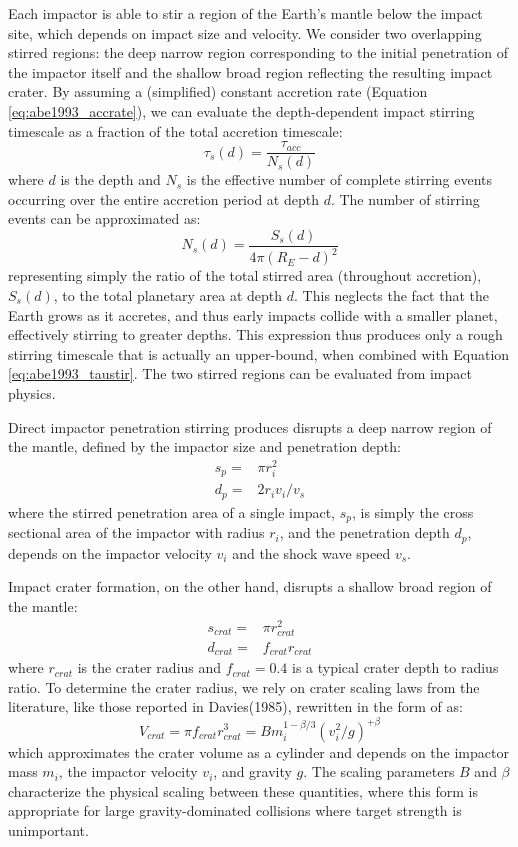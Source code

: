 Each impactor is able to stir a region of the Earth's mantle below the impact site, which depends on impact size and velocity.
We consider two overlapping stirred regions: the deep narrow region corresponding to the initial penetration of the impactor itself and the shallow broad region reflecting the resulting impact crater.
By assuming a (simplified) constant accretion rate (Equation \ref{eq:abe1993_accrate}), we can evaluate the depth-dependent impact stirring timescale as a fraction of the total accretion timescale:
\begin{equation}
  \tau_{s}(d) = \frac{\tau_{acc}}{N_{s}(d)}
  \label{eq:abe1993_taustir}
\end{equation}
where $d$ is the depth and $N_{s}$ is the effective number of complete stirring events occurring over the entire accretion period at depth $d$.
The number of stirring events can be approximated as:
\begin{equation}
  N_{s}(d) = \frac{S_s(d)}{4\pi(R_E - d)^2}
\end{equation}
representing simply the ratio of the total stirred area (throughout accretion), $S_s(d)$, to the total planetary area at depth $d$.
This neglects the fact that the Earth grows as it accretes, and thus early impacts collide with a smaller planet, effectively stirring to greater depths.
This expression thus produces only a rough stirring timescale that is actually an upper-bound, when combined with Equation \ref{eq:abe1993_taustir}.
The two stirred regions can be evaluated from impact physics. 

Direct impactor penetration stirring produces disrupts a deep narrow region of the mantle, defined by the impactor size and penetration depth:
\begin{eqnarray}
  s_p =& \pi r_i^2 \\
  d_p =& 2 r_i v_i/v_s
\end{eqnarray}
where the stirred penetration area of a single impact, $s_p$, is simply the cross sectional area of the impactor with radius $r_i$, and the penetration depth $d_p$, depends on the impactor velocity $v_i$ and the shock wave speed $v_s$.


Impact crater formation, on the other hand, disrupts a shallow broad region of the mantle:
\begin{eqnarray}
  s_{crat} =& \pi r_{crat}^2 \\
  d_{crat} =& f_{crat} r_{crat}
\end{eqnarray}
where $r_{crat}$ is the crater radius and $f_{crat}=0.4$ is a typical crater depth to radius ratio.
To determine the crater radius, we rely on crater scaling laws from the literature, like those reported in Davies(1985), rewritten in the form of \cite{ABE93} as:
\begin{equation}
  V_{crat} = \pi f_{crat} r_{crat}^3 = B m_i^{1-\beta/3} (v_i^2/g)^{+ \beta}
\end{equation}
which approximates the crater volume as a cylinder and depends on the impactor mass $m_i$, the impactor velocity $v_i$, and gravity $g$.
The scaling parameters $B$ and $\beta$ characterize the physical scaling between these quantities, where this form is appropriate for large gravity-dominated collisions where target strength is unimportant.


